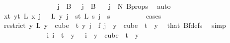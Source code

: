 \begin{isabellebody}
\ \ \ \ \ \ \isamarkupfalse%
{\isacharminus}{\kern0pt}\isanewline
\ \ \ \ \ \ \ \ \isamarkupfalse%
\ {\isachardoublequoteopen}j\ {\isasymin}\ B\ {}{\isachardoublequoteclose}\ {\isacharbar}{\kern0pt}\ {\isachardoublequoteopen}j\ {\isasymin}\ B\ {}{\isachardoublequoteclose}\ \isamarkupfalse%
\ {\isacartoucheopen}j\ {\isacharless}{\kern0pt}\ N{\isacharprime}{\kern0pt}{\isacartoucheclose}\ B{\isacharunderscore}{\kern0pt}props\ \isamarkupfalse%
\ auto\isanewline
\ \ \ \ \ \ \ \ \isamarkupfalse%
\ \isamarkupfalse%
\ {\isachardoublequoteopen}{\isacharparenleft}{\kern0pt}{\isasymforall}x{\isacharless}{\kern0pt}t{\isacharplus}{\kern0pt}{}{\isachardot}{\kern0pt}\ {\isasymforall}y{\isacharless}{\kern0pt}t{\isacharplus}{\kern0pt}{}{\isachardot}{\kern0pt}\ L{\isacharprime}{\kern0pt}\ x\ j\ {\isacharequal}{\kern0pt}\ \ L{\isacharprime}{\kern0pt}\ y\ j{\isacharparenright}{\kern0pt}\ {\isasymor}\ {\isacharparenleft}{\kern0pt}{\isasymforall}s{\isacharless}{\kern0pt}t{\isacharplus}{\kern0pt}{}{\isachardot}{\kern0pt}\ L{\isacharprime}{\kern0pt}\ s\ j\ {\isacharequal}{\kern0pt}\ s{\isacharparenright}{\kern0pt}{\isachardoublequoteclose}\isanewline
\ \ \ \ \ \ \ \ \isamarkupfalse%
\ {\isacharparenleft}{\kern0pt}cases{\isacharparenright}{\kern0pt}\isanewline
\ \ \ \ \ \ \ \ \ \ \isamarkupfalse%
\ {}\isanewline
\ \ \ \ \ \ \ \ \ \ \isamarkupfalse%
\ \isamarkupfalse%
\ {\isachardoublequoteopen}{\isacharparenleft}{\kern0pt}restrict\ {\isacharparenleft}{\kern0pt}{\isasymlambda}y{\isachardot}{\kern0pt}\ L\ {\isacharparenleft}{\kern0pt}y\ {}{\isacharparenright}{\kern0pt}{\isacharparenright}{\kern0pt}\ {\isacharparenleft}{\kern0pt}cube\ {}\ t{\isacharparenright}{\kern0pt}{\isacharparenright}{\kern0pt}\ y\ j\ {\isacharequal}{\kern0pt}\ f\ j{\isachardoublequoteclose}\ \ {\isachardoublequoteopen}y\ {\isasymin}\ cube\ {}\ t{\isachardoublequoteclose}\ \ y\ \isamarkupfalse%
\ that\ Bf{\isacharunderscore}{\kern0pt}defs\ \isamarkupfalse%
\ simp\isanewline
\ \ \ \ \ \ \ \ \ \ \isamarkupfalse%
\ \isamarkupfalse%
\ {\isachardoublequoteopen}{\isasymexists}{\isacharbang}{\kern0pt}i{\isachardot}{\kern0pt}\ i\ {\isacharless}{\kern0pt}\ t\ {\isasymand}\ y\ {}\ {\isacharequal}{\kern0pt}\ i{\isachardoublequoteclose}\ \ {\isachardoublequoteopen}y\ {\isasymin}\ cube\ {}\ t{\isachardoublequoteclose}\ \ y\ \isamarkupfalse%

\end{isabellebody}
